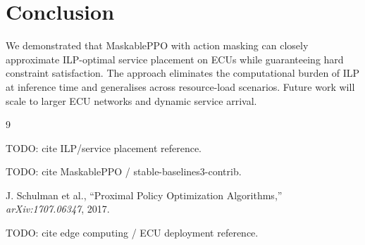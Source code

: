 \documentclass[conference]{IEEEtran}
\begin{document}
\section{Conclusion}

We demonstrated that MaskablePPO with action masking can closely
approximate ILP-optimal service placement on ECUs while guaranteeing
hard constraint satisfaction.
The approach eliminates the computational burden of ILP at inference time
and generalises across resource-load scenarios.
Future work will scale to larger ECU networks and dynamic service arrival.

\begin{thebibliography}{9}

TODO: cite ILP/service placement reference.

TODO: cite MaskablePPO / stable-baselines3-contrib.

J. Schulman et al., ``Proximal Policy Optimization Algorithms,''
\textit{arXiv:1707.06347}, 2017.

TODO: cite edge computing / ECU deployment reference.

\end{thebibliography}
\end{document}
